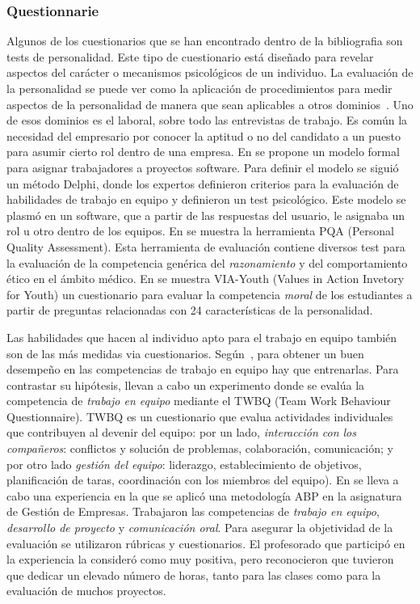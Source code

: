 \subsubsection{Questionnarie}

Algunos de los cuestionarios que se han encontrado dentro de la bibliografia son tests de personalidad. Este tipo de cuestionario está diseñado para revelar aspectos del carácter o mecanismos psicológicos de un individuo. La evaluación de la personalidad se puede ver como la aplicación de procedimientos para medir aspectos de la personalidad de manera que sean aplicables a otros dominios~\cite{wiggins2003paradigms}. Uno de esos dominios es el laboral, sobre todo las entrevistas de trabajo. Es común la necesidad del empresario por conocer la aptitud o no del candidato a un puesto para asumir cierto rol dentro de una empresa. En \cite{andre2011formal} se propone un modelo formal para asignar trabajadores a proyectos software. Para definir el modelo se siguió un método Delphi, donde los expertos definieron criterios para la evaluación de habilidades de trabajo en equipo y definieron un test psicológico. Este modelo se plasmó en un software, que a partir de las respuestas del usuario, le asignaba un rol u otro dentro de los equipos. En \cite{lumsden2005assessment} se muestra la herramienta PQA (Personal Quality Assessment). Esta herramienta de evaluación contiene diversos test para la evaluación de la competencia genérica del \emph{razonamiento} y del {comportamiento ético} en el ámbito médico. En \cite{park2006moral} se muestra VIA-Youth (Values in Action Invetory for Youth) un cuestionario para evaluar la competencia \emph{moral} de los estudiantes a partir de preguntas relacionadas con 24 características de la personalidad. 

Las habilidades que hacen al individuo apto para el trabajo en equipo también son de las más medidas via cuestionarios. Según~\cite{martinez2014teamwork}, para obtener un buen desempeño en las competencias de trabajo en equipo hay que entrenarlas. Para contrastar su hipótesis, llevan a cabo un experimento donde se evalúa la competencia de \emph{trabajo en equipo} mediante el TWBQ (Team Work Behaviour Questionnaire). TWBQ es un cuestionario que evalua actividades individuales que contribuyen al devenir del equipo: por un lado, \emph{interacción con los compañeros}: conflictos y solución de problemas, colaboración, comunicación; y por otro lado \emph{gestión del equipo}: liderazgo, establecimiento de objetivos, planificación de taras, coordinación con los miembros del equipo). En \cite{barbera2011design} se lleva a cabo una experiencia en la que se aplicó una metodología ABP en la asignatura de Gestión de Empresas. Trabajaron las competencias de \emph{trabajo en equipo}, \emph{desarrollo de proyecto} y \emph{comunicación oral}. Para asegurar la objetividad de la evaluación se utilizaron rúbricas y cuestionarios. El profesorado que participó en la experiencia la consideró como muy positiva, pero reconocieron que tuvieron que dedicar un elevado número de horas, tanto para las clases como para la evaluación de muchos proyectos.

